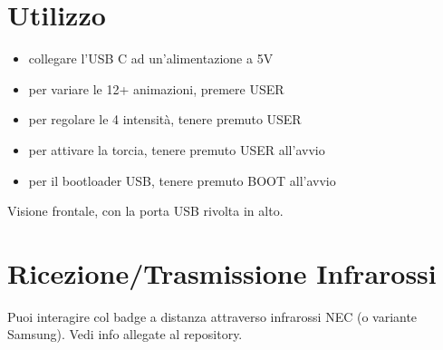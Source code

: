 \documentclass[10pt]{datasheet}
\newcommand*\circled[1]{\tikz[baseline=(char.base)]{
		\node[shape=circle,draw,inner sep=2pt, fill=white] (char) {#1};}}
\begin{document}
	
	\section{Utilizzo}
	
	\begin{itemize}[itemsep=1pt]
		\item{collegare l'USB C ad un'alimentazione a 5V}
		\item{per variare le 12+ animazioni, premere USER}
		\item{per regolare le 4 intensità, tenere premuto USER}
		\item{per attivare la torcia, tenere premuto USER all'avvio}
		\item{per il bootloader USB, tenere premuto BOOT all'avvio}
	\end{itemize}
	

	\begin{center}

	\end{center}
		Visione frontale, con la porta USB rivolta in alto. 
		
		\section{Ricezione/Trasmissione Infrarossi}
		Puoi interagire col badge a distanza attraverso infrarossi NEC (o variante Samsung). Vedi info allegate al repository.
	
\end{document}
